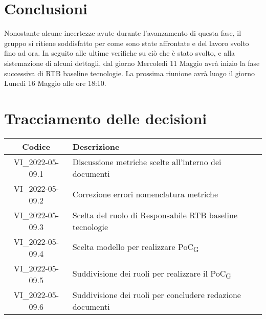 \section{Conclusioni}
Nonostante alcune incertezze avute durante l'avanzamento di questa fase, il gruppo si ritiene soddisfatto per come sono state affrontate e del lavoro svolto fino ad ora. In seguito alle ultime verifiche su ciò che è stato svolto, e alla sistemazione di alcuni dettagli, dal giorno Mercoledì 11 Maggio avrà inizio la fase successiva di RTB baseline tecnologie. 
La prossima riunione avrà luogo il giorno Lunedì 16 Maggio alle ore 18:10. 
\newpage

\section*{Tracciamento delle decisioni}
	\renewcommand{\arraystretch}{1.8} %
	\begin{tabular}{ |c|l| }
		\hline
		\textbf{Codice} & \textbf{Descrizione} \\
		\hline
		VI\_2022-05-09.1 & Discussione metriche scelte all'interno dei documenti\\ %
		\hline
		VI\_2022-05-09.2 & Correzione errori nomenclatura metriche\\ %
		\hline
		VI\_2022-05-09.3 & Scelta del ruolo di Responsabile RTB baseline tecnologie\\ %
		\hline
		VI\_2022-05-09.4 & Scelta modello per realizzare PoC\textsubscript{G}\\ %
		\hline
		VI\_2022-05-09.5 & Suddivisione dei ruoli per realizzare il PoC\textsubscript{G}\\ %
		\hline
		VI\_2022-05-09.6 & Suddivisione dei ruoli per concludere redazione documenti\\ %
		\hline
	\end{tabular}